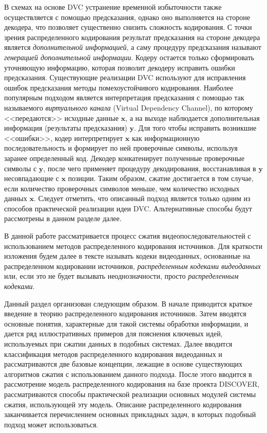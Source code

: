 В схемах на основе DVC устранение временной избыточности также осуществляется с помощью предсказания, однако оно выполняется на стороне декодера, что позволяет существенно снизить сложность кодирования. С точки зрения распределенного кодирования результат предсказания на стороне декодера является \textit{дополнительной информацией}, а саму процедуру предсказания называют \textit{генерацией дополнительной информации}. Кодеру остается только сформировать уточняющую информацию, которая позволит декодеру исправить ошибки предсказания. Существующие реализации DVC используют для исправления ошибок предсказания методы помехоустойчивого кодирования. Наиболее популярным подходом является интерпретация предсказания с помощью так называемого \textit{виртуального канала} (Virtual Dependency Channel), по которому <<передаются>> исходные данные $\mathbf{x}$, а на выходе наблюдается дополнительная информация (результаты предсказания) $\mathbf{y}$. Для того чтобы исправить возникшие <<ошибки>>, кодер интерпретирует $\mathbf{x}$ как информационную последовательность и формирует по ней проверочные символы, используя заранее определенный код. Декодер конкатенирует полученные проверочные символы с $\mathbf{y}$, после чего применяет процедуру декодирования, восстанавливая в $\mathbf{y}$ несовпадающие с $\mathbf{x}$ позиции. Таким образом, сжатие достигается в том случае, если количество проверочных символов меньше, чем количество исходных данных $\mathbf{x}$. Следует отметить, что описанный подход является только одним из способов практической реализации идеи DVC. Альтернативные способы будут рассмотрены в данном разделе далее.

В данной работе рассматривается процесс сжатия видеопоследовательностей с использованием методов распределенного кодирования источников. Для краткости изложения будем далее в тексте называть кодеки видеоданных, основанные на распределенном кодировании источников, \textit{распределенным кодеками видеоданных} или, если это не будет вызывать неоднозначности, просто \textit{распределенным кодеками}.

Данный раздел организован следующим образом. В начале приводится краткое введение в теорию распределенного кодирования источников. Затем вводятся основные понятия, характерные для такой системы обработки информации, и дается ряд иллюстративных примеров для пояснения ключевых идей, используемых при сжатии данных в подобных системах. Далее вводится классификация методов распределенного кодирования видеоданных и рассматриваются две базовые концепции, лежащие в основе существующих алгоритмов сжатия с использованием данного подхода. После этого вводится в рассмотрение модель распределенного кодирования на базе проекта DISCOVER, рассматриваются способы практической реализации основных модулей системы сжатия, использующей эту модель. Описание распределенного кодирования заканчивается перечислением основных прикладных задач, в которых подобный подход может использоваться.

